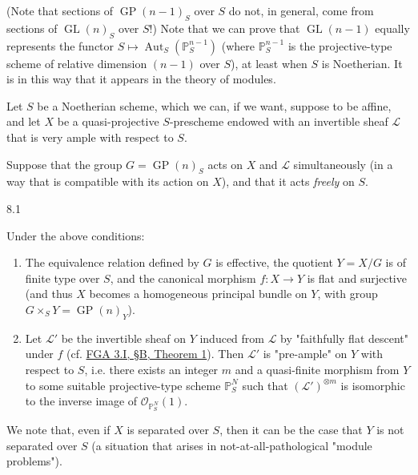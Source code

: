   (Note that sections of \(\operatorname {GP}(n-1)_S\) over \(S\) do not, in general, come from sections of \(\operatorname {GL}(n)_S\) over \(S\)!)
  Note that we can prove that \(\operatorname {GL}(n-1)\) equally represents the functor \(S\mapsto \operatorname {Aut}_S(\mathbb {P}_S^{n-1})\) (where \(\mathbb {P}_S^{n-1}\) is the projective-type scheme of relative dimension \((n-1)\) over \(S\)), at least when \(S\) is Noetherian.
  It is in this way that it appears in the theory of modules.\par{}Let \(S\) be a Noetherian scheme, which we can, if we want, suppose to be affine, and let \(X\) be a quasi-projective \(S\)-prescheme endowed with an invertible sheaf \(\mathscr {L}\) that is very ample with respect to \(S\).
  
  Suppose that the group \(G=\operatorname {GP}(n)_S\) acts on \(X\) and \(\mathscr {L}\) simultaneously (in a way that is compatible with its action on \(X\)), and that it acts \emph{freely} on \(S\).\begin{conjecture}{8.1}\label{fga3.iii-8-conjecture-8.1}\skipsinglepar\par{}Under the above conditions:

    \begin{enumerate}\item{}The equivalence relation defined by \(G\) is effective, the quotient \(Y=X/G\) is of finite type over \(S\), and the canonical morphism \(f\colon  X\to  Y\) is flat and surjective (and thus \(X\) becomes a homogeneous principal bundle on \(Y\), with group \(G\times _S Y=\operatorname {GP}(n)_Y\)).

      \item{}Let \(\mathscr {L}'\) be the invertible sheaf on \(Y\) induced from \(\mathscr {L}\) by "faithfully flat descent" under \(f\) (cf. \hyperref[fga3.i-b.1-theorem-1]{FGA 3.I, §B, Theorem 1}).
        Then \(\mathscr {L}'\) is "pre-ample" on \(Y\) with respect to \(S\), i.e. there exists an integer \(m\) and a quasi-finite morphism from \(Y\) to some suitable projective-type scheme \(\mathbb {P}_S^N\) such that \((\mathscr {L}')^{\otimes  m}\) is isomorphic to the inverse image of \(\mathcal {O}_{\mathbb {P}_S^N}(1)\).\end{enumerate}\end{conjecture}\par{}We note that, even if \(X\) is separated over \(S\), then it can be the case that \(Y\) is not separated over \(S\) (a situation that arises in not-at-all-pathological "module problems").
